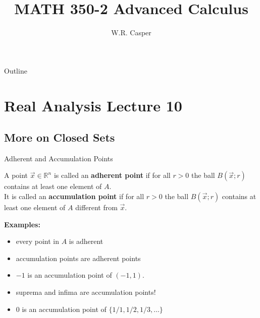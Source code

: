 \documentclass{beamer}
\title{MATH 350-2 Advanced Calculus}
\subtitle
{} %
\author[W.R. Casper] %
{W.R. Casper}
\institute[California State University Fullerton] %
{
  Department of Mathematics\\
  California State University Fullerton}
\begin{document}
\begin{frame}
  \titlepage
\end{frame}

\begin{frame}{Outline}
  \tableofcontents
\end{frame}



\section{Real Analysis Lecture 10}
\subsection{More on Closed Sets}

\begin{frame}{Adherent and Accumulation Points}
\begin{defn}
A point $\vec x\in \mathbb{R}^n$ is called an \textbf{adherent point} if for all $r > 0$ the ball $B(\vec x; r)$ contains at least one element of $A$.\\
\pause
It is called an \textbf{accumulation point} if for all $r > 0$ the ball $B(\vec x; r)$ contains at least one element of $A$ {\color{red} different from $\vec x$}.
\end{defn}
\pause
\textbf{Examples:}
\begin{itemize}
\pause
\item every point in $A$ is adherent
\pause
\item accumulation points are adherent points
\pause
\item $-1$ is an accumulation point of $(-1,1)$.
\pause
\item suprema and infima are accumulation points!
\pause
\item $0$ is an accumulation point of $\{1/1,1/2,1/3,\dots\}$
\end{itemize}
\end{frame}
\end{document}
